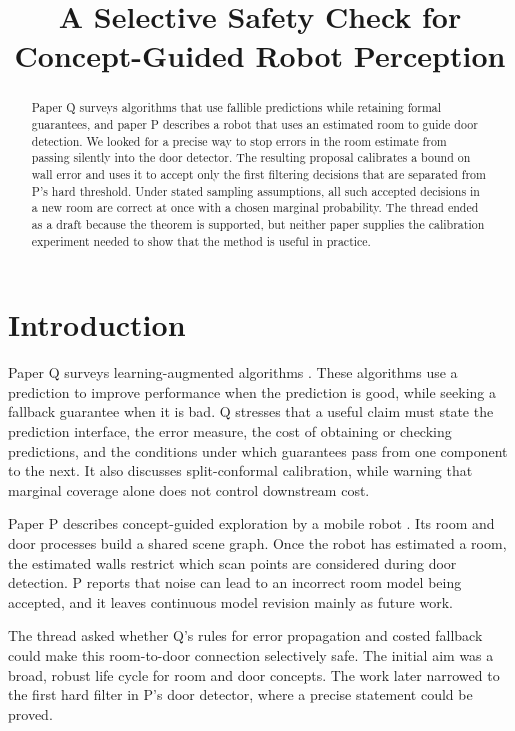 \documentclass{article}
\title{A Selective Safety Check for Concept-Guided Robot Perception}
\author{}
\date{}
\begin{document}
\maketitle

\begin{abstract}
Paper Q surveys algorithms that use fallible predictions while retaining formal guarantees, and paper P describes a robot that uses an estimated room to guide door detection. We looked for a precise way to stop errors in the room estimate from passing silently into the door detector. The resulting proposal calibrates a bound on wall error and uses it to accept only the first filtering decisions that are separated from P's hard threshold. Under stated sampling assumptions, all such accepted decisions in a new room are correct at once with a chosen marginal probability. The thread ended as a draft because the theorem is supported, but neither paper supplies the calibration experiment needed to show that the method is useful in practice.
\end{abstract}

\section{Introduction}

Paper Q surveys learning-augmented algorithms \cite{Q}. These algorithms use a prediction to improve performance when the prediction is good, while seeking a fallback guarantee when it is bad. Q stresses that a useful claim must state the prediction interface, the error measure, the cost of obtaining or checking predictions, and the conditions under which guarantees pass from one component to the next. It also discusses split-conformal calibration, while warning that marginal coverage alone does not control downstream cost.

Paper P describes concept-guided exploration by a mobile robot \cite{P}. Its room and door processes build a shared scene graph. Once the robot has estimated a room, the estimated walls restrict which scan points are considered during door detection. P reports that noise can lead to an incorrect room model being accepted, and it leaves continuous model revision mainly as future work.

The thread asked whether Q's rules for error propagation and costed fallback could make this room-to-door connection selectively safe. The initial aim was a broad, robust life cycle for room and door concepts. The work later narrowed to the first hard filter in P's door detector, where a precise statement could be proved.
\end{document}
